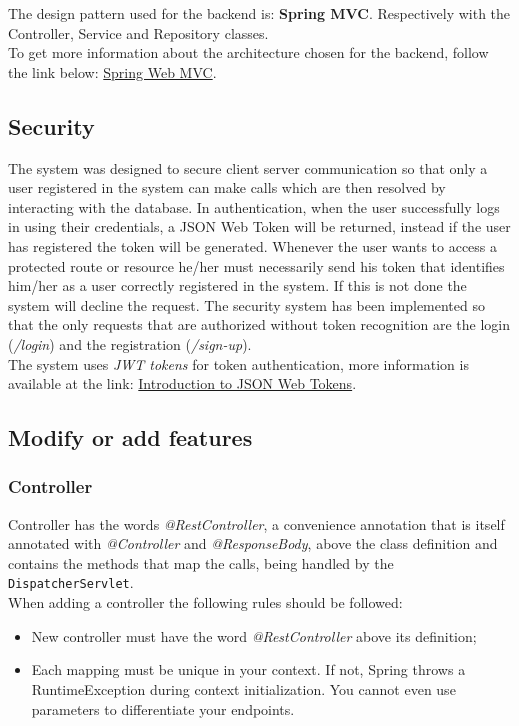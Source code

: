 The design pattern used for the backend is: \textbf{Spring MVC}.
Respectively with the Controller, Service and Repository classes.
\\ 
To get more information about the architecture chosen for the backend, follow the link below: \href{https://docs.spring.io/spring/docs/current/spring-framework-reference/web.html}{Spring Web MVC}.


\subsection{Security}
The system was designed to secure client server communication so that only a user registered in the system can make calls which are then resolved by interacting with the database. 
In authentication, when the user successfully logs in using their credentials, a JSON Web Token will be returned, instead if the user has registered the token will be generated. Whenever the user wants to access a protected route or resource he/her must necessarily send his token that identifies him/her as a user correctly registered in the system. If this is not done the system will decline the request. 
The security system has been implemented so that the only requests that are authorized without token recognition are the login (\textit{/login}) and the registration (\textit{/sign-up}).\\
The system uses \textit{JWT tokens} for token authentication, more information is available at the link: \href{https://jwt.io/introduction/}{Introduction to JSON Web Tokens}.

\subsection{Modify or add features}
\subsubsection{Controller}
Controller has the words \textit{@RestController}, a convenience annotation that is itself annotated with \textit{@Controller} and \textit{@ResponseBody}, above the class definition and contains the methods that map the calls, being handled by the \texttt{DispatcherServlet}.\\
When adding a controller the following rules should be followed:
\begin{itemize}
\item New controller must have the word \textit{@RestController} above its definition;
\item Each mapping must be unique in your context. If not, Spring throws a RuntimeException during context initialization. You cannot even use parameters to differentiate your endpoints.
\end{itemize}

